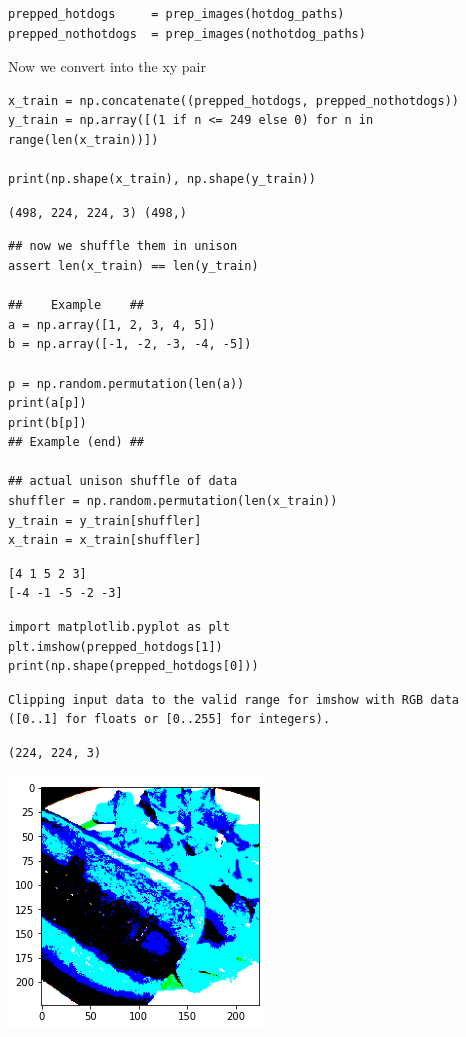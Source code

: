 \documentclass[
]{article}
\begin{document}
\begin{Verbatim}[frame=single]
prepped_hotdogs     = prep_images(hotdog_paths)
prepped_nothotdogs  = prep_images(nothotdog_paths)
\end{Verbatim}

Now we convert into the xy pair

\begin{Verbatim}[frame=single]
x_train = np.concatenate((prepped_hotdogs, prepped_nothotdogs))
y_train = np.array([(1 if n <= 249 else 0) for n in range(len(x_train))])

print(np.shape(x_train), np.shape(y_train))
\end{Verbatim}

\begin{verbatim}
(498, 224, 224, 3) (498,)
\end{verbatim}

\begin{Verbatim}[frame=single]
## now we shuffle them in unison
assert len(x_train) == len(y_train)

##    Example    ##
a = np.array([1, 2, 3, 4, 5])
b = np.array([-1, -2, -3, -4, -5])

p = np.random.permutation(len(a))
print(a[p])
print(b[p])
## Example (end) ##

## actual unison shuffle of data
shuffler = np.random.permutation(len(x_train))
y_train = y_train[shuffler]
x_train = x_train[shuffler]
\end{Verbatim}

\begin{verbatim}
[4 1 5 2 3]
[-4 -1 -5 -2 -3]
\end{verbatim}


\begin{Verbatim}[frame=single]
import matplotlib.pyplot as plt
plt.imshow(prepped_hotdogs[1])
print(np.shape(prepped_hotdogs[0]))
\end{Verbatim}

\begin{verbatim}
Clipping input data to the valid range for imshow with RGB data ([0..1] for floats or [0..255] for integers).
\end{verbatim}

\begin{verbatim}
(224, 224, 3)
\end{verbatim}

\includegraphics{bef603d52cf14721fe48e3182b104cf14476e163.png}
\end{document}
